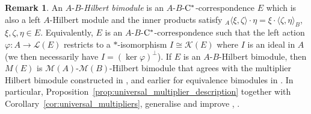 \documentclass[11 pt, leqno]{amsart}
\numberwithin{equation}{section}
\theoremstyle{plain}
\theoremstyle{definition}
\newtheorem {rem} [thm]{Remark}
\newcommand{\LL}{\mathcal L}
\newcommand{\M}{\mathcal M}
\newcommand{\K}{\mathcal{K}}
\newcommand{\cst}{\ifmmode\mathrm{C}^*\else{$\mathrm{C}^*$}\fi}
\begin{document}

\begin{rem}  
An $A$-$B$-\emph{Hilbert bimodule} is an $A$-$B$-$\cst$-correspondence $E$ which is also a left $A$-Hilbert module and the inner products satisfy ${_{A}\langle} \xi, \zeta \rangle \cdot \eta =  \xi \cdot \langle \zeta,  \eta \rangle_{B}$, $\xi, \zeta, \eta\in E$. 
Equivalently, $E$ is an $A$-$B$-$\cst$-correspondence such that the left action  $\varphi:A \to \LL(E)$ restricts to a $*$-isomorphism $I\cong \K(E)$ where $I$ is an ideal in $A$ (we then necessarily have $I=(\ker\varphi)^\bot$). 
If $E$ is an  $A$-$B$-Hilbert bimodule, then  $M(E)$ is  $\M(A)$-$\M(B)$-Hilbert bimodule that agrees with the multiplier Hilbert bimodule constructed in \cite{Schweizer},  and earlier for equivalence bimodules in \cite{ER}. 
In particular, Proposition~\ref{prop:universal_multiplier_description} together with Corollary~\ref{cor:universal_multipliers}, generalise and improve \cite[Proposition 3.6]{Schweizer}, \cite[Proposition 1.2]{ER}.
\end{rem}
\end{document}

